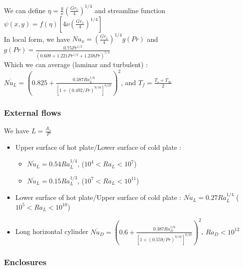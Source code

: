 \documentclass[../main.tex]{subfiles}
\begin{document}
We can define $\eta = \frac{y}{x} (\frac{Gr_x}{4})^{1/4}$ and streamline function $\psi(x,y) = f(\eta) [4\nu (\frac{Gr_x}{4})^{1/4}]$\\

In local form, we have $Nu_x = (\frac{Gr_x}{4})^{1/4} g(Pr)$ and $g(Pr) = \frac{0.75 Pr^{1/2}}{(0.609+1.221Pr^{1/2} + 1.238Pr)^{1/4}}$\\

Which we can average (laminar and turbulent) : $\overline{Nu_L} = (0.825 + \frac{0.387 Ra_L^{1/6}}{[1+(0.492/Pr)^{9/16}]^{8/27}})^2$, and $T_f = \frac{T_s+T_\infty}{2}$\\

\subsubsection{External flows}
We have $L = \frac{A_s}{P}$\\

\begin{itemize}
    \item Upper surface of hot plate/Lower surface of cold plate : \begin{itemize}
        \item $\overline{Nu_L} = 0.54 Ra_L^{1/4}$, ($10^4 < Ra_L < 10^7$)\\
        \item $\overline{Nu_L} = 0.15Ra_L^{1/3}$, ($10^7<Ra_L<10^11$)\\
    \end{itemize}
    \item Lower surface of hot plate/Upper surface of cold plate : $\overline{Nu_L} = 0.27 Ra_L^{1/4}$ ($10^5 < Ra_L < 10^10$)\\
    \item Long horizontal cylinder $\overline{Nu_D} = (0.6 + \frac{0.387 Ra_D^{1/6}}{[1+(0.559/Pr)^{9/16}]^{8/27}})^2$, $Ra_D < 10^12$\\
\end{itemize}

\subsubsection{Enclosures}
\end{document}
